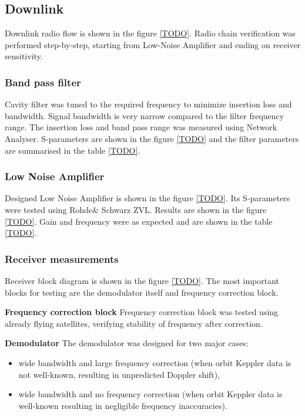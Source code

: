 \subsection{Downlink}
Downlink radio flow is shown in the figure \ref{TODO}. Radio chain verification was performed step-by-step, starting from Low-Noise Amplifier and ending on receiver sensitivity.

\subsubsection{Band pass filter}
Cavity filter was tuned to the required frequency to minimize insertion loss and bandwidth. Signal bandwidth is very narrow compared to the filter frequency range.
The insertion loss and band pass range was measured using Network Analyser. S-parameters are shown in the figure \ref{TODO} and the filter parameters are summarised in the table \ref{TODO}.


\subsubsection{Low Noise Amplifier}
Designed Low Noise Amplifier is shown in the figure \ref{TODO}. Its S-parameters were tested using Rohde\& Schwarz ZVL. Results are shown in the figure \ref{TODO}. Gain and frequency were as expected and are shown in the table \ref{TODO}.



\subsubsection{Receiver measurements}
Receiver block diagram is shown in the figure \ref{TODO}. The most important blocks for testing are the demodulator itself and frequency correction block.

\textbf{Frequency correction block}
Frequency correction block was tested using already flying satellites, verifying stability of frequency after correction.


\textbf{Demodulator}
The demodulator was designed for two major cases:
\begin{itemize}
    \item wide bandwidth and large frequency correction (when orbit Keppler data is not well-known, resulting in unpredicted Doppler shift),
    \item wide bandwidth and no frequency correction (when orbit Keppler data is well-known resulting in negligible frequency inaccuracies).
\end{itemize}


